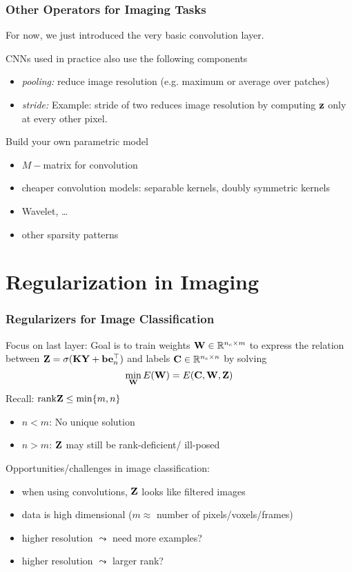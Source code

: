 \documentclass[12pt,fleqn,handout]{beamer}
\begin{document}
\begin{frame}\frametitle{Other Operators for Imaging Tasks}
	For now, we just introduced the very basic convolution layer. 
	
	CNNs used in practice also use the following components 
	\begin{itemize}
		\item \emph{pooling:} reduce image resolution (e.g.  maximum or average over patches)
		\item \emph{stride:} Example: stride of two reduces image resolution by computing ${\bf z}$ only at every other pixel. 
	\end{itemize}
	
	\bigskip
	
	Build your own parametric model
	\begin{itemize}
		\item $M-$matrix for convolution
		\item cheaper convolution models: separable kernels, doubly symmetric kernels
		\item Wavelet, \ldots
		\item other sparsity patterns
	\end{itemize}
	
\end{frame}

\section{Regularization in Imaging} %
\label{sec:regularization_in_imaging}

\begin{frame}[fragile]\frametitle{Regularizers for Image Classification}
	Focus on last layer: Goal is to train weights ${\bf W} \in \mathbb{R}^{n_c \times m}$ to express the relation between  ${\bf Z} = \sigma({\bf K} {\bf Y} + {\bf b} {\bf e}_n^\top)$ and labels ${\bf C} \in \mathbb{R}^{n_c \times n}$ by solving
$$
	 \min_{\bf W}  E({\bf W}) =  E({\bf C},{\bf W},{\bf Z})
$$ 
Recall: ${\rm rank}{\bf Z} \leq \min\{m,n\}$
\begin{itemize}
\item $n < m$: No unique solution
\item $n > m$: ${\bf Z}$ may still be rank-deficient/ ill-posed
\end{itemize}

\pause

Opportunities/challenges in image classification: 
\begin{itemize}
	\item when using convolutions, ${\bf Z}$ looks like filtered images
	\item data is high dimensional ($m \approx$ number of pixels/voxels/frames)
	\item higher resolution $\leadsto$ need more examples? 
	\item higher resolution $\leadsto$ larger rank?
\end{itemize}

\end{frame}
\end{document}
